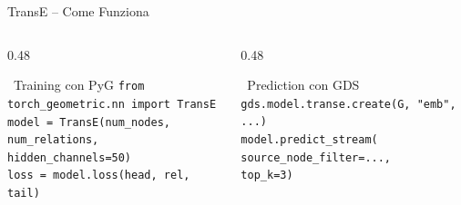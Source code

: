 \documentclass[aspectratio=169]{beamer}
\newcommand{\icoCode}{\faCode}
\newcommand{\icoPlay}{\faPlay}
\newcommand{\icoCode}{\texttt{</>}}
\newcommand{\icoPlay}{\ding{228}}
\begin{document}
\begin{frame}{TransE -- Come Funziona}
  \vspace{0.4cm}
  \begin{columns}[T]
    \begin{column}{0.48\textwidth}
      \begin{block}{\icoCode\ Training con PyG}
        \footnotesize
        \texttt{from torch\_geometric.nn import TransE}\\
        \texttt{model = TransE(num\_nodes, num\_relations,}\\
        \texttt{\hspace{2.5em}hidden\_channels=50)}\\
        \texttt{loss = model.loss(head, rel, tail)}
      \end{block}
    \end{column}
    \begin{column}{0.48\textwidth}
      \begin{block}{\icoPlay\ Prediction con GDS}
        \footnotesize
        \texttt{gds.model.transe.create(G, "emb", ...)}\\
        \texttt{model.predict\_stream(}\\
        \texttt{\hspace{2em}source\_node\_filter=...,}\\
        \texttt{\hspace{2em}top\_k=3)}
      \end{block}
    \end{column}
  \end{columns}
\end{frame}
\end{document}
